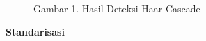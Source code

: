 \documentclass[
  letterpaper,
  DIV=11,
  numbers=noendperiod]{scrreprt}
\begin{document}
\begin{figure}
\begin{minipage}[t]{0.33\linewidth}
{{}

\caption{Gambar 1. Hasil Deteksi Haar Cascade}

}

\end{minipage}%
%
\begin{minipage}[t]{0.33\linewidth}

{\centering 


}

\end{minipage}%

\end{figure}

\textbf{Standarisasi}
\end{document}
